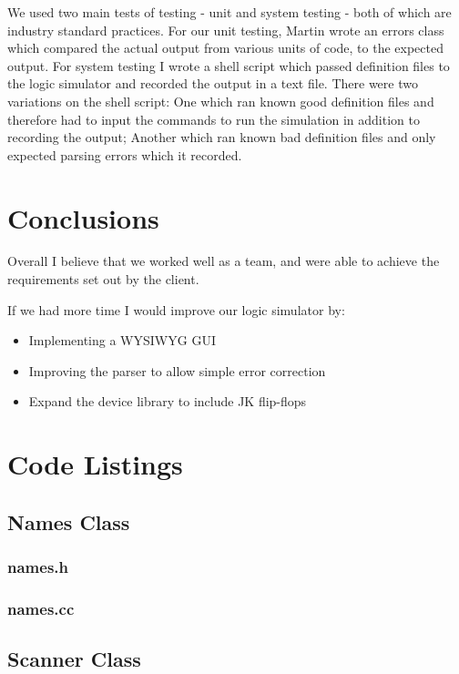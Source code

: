 \documentclass[a4paper,10pt]{article}
\begin{document}
We used two main tests of testing - unit and system testing - both of which are industry standard practices. For our unit testing, Martin wrote an errors class which compared the actual output from various units of code, to the expected output. For system testing I wrote a shell script which passed definition files to the logic simulator and recorded the output in a text file. There were two variations on the shell script: One which ran known good definition files and therefore had to input the commands to run the simulation in addition to recording the output; Another which ran known bad definition files and only expected parsing errors which it recorded.

\section{Conclusions}

Overall I believe that we worked well as a team, and were able to achieve the requirements set out by the client.

If we had more time I would improve our logic simulator by:

\begin{itemize}
\item Implementing a WYSIWYG GUI
\item Improving the parser to allow simple error correction
\item Expand the device library to include JK flip-flops
\end{itemize}

\pagebreak

\appendix
\section{Code Listings}
\subsection{Names Class}
\subsubsection{names.h}

\subsubsection{names.cc}


\subsection{Scanner Class}
\end{document}
